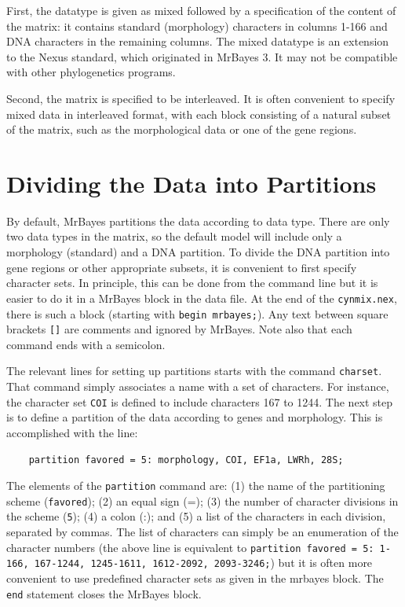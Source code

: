 \documentclass[12pt]{book}
\begin{document}
First, the datatype is given as mixed followed by a specification of the content of the matrix: it contains 
standard (morphology) characters in columns 1-166 and DNA characters in the remaining columns. The mixed 
datatype is an extension to the Nexus standard, which originated in MrBayes 3. It may not be compatible with 
other phylogenetics programs.

Second, the matrix is specified to be interleaved. It is often convenient to specify mixed data in 
interleaved format, with each block consisting of a natural subset of the matrix, such as the morphological 
data or one of the gene regions.

\section{Dividing the Data into Partitions}

By default, MrBayes partitions the data according to data type. There are only two data types in the matrix, 
so the default model will include only a morphology (standard) and a DNA partition. To divide the DNA 
partition into gene regions or other appropriate subsets, it is convenient to first specify character sets. 
In principle, this can be done from the command line but it is easier to do it in a MrBayes block in the 
data file. At the end of the \texttt{cynmix.nex}, there is such a block (starting with \texttt{begin mrbayes;}).
Any text between square brackets \texttt{[]} are comments and ignored by MrBayes.
Note also that each command ends with a semicolon.

The relevant lines for setting up partitions starts with the command \texttt{charset}. That command simply
associates a name with a set of characters. For instance, the character set \texttt{COI} is defined to
include characters 167 to 1244. The next step is to define a partition of the data according to genes
and morphology. This is accomplished with the line:

\begin{singlespacing}
\begin{verbatim}
    partition favored = 5: morphology, COI, EF1a, LWRh, 28S;
\end{verbatim}
\end{singlespacing}

The elements of the \texttt{partition} command are: (1) the name of the partitioning scheme 
(\texttt{favored}); (2) an equal sign (=); (3) the number of character divisions in the scheme (\texttt{5}); 
(4) a colon (:); and (5) a list of the characters in each division, separated by commas. The list of 
characters can simply be an enumeration of the character numbers (the above line is equivalent to 
\texttt{partition favored = 5: 1-166, 167-1244, 1245-1611, 1612-2092, 2093-3246;}) but it is often more 
convenient to use predefined character sets as given in the mrbayes block. 
The \texttt{end} statement closes the MrBayes block.
\end{document}
